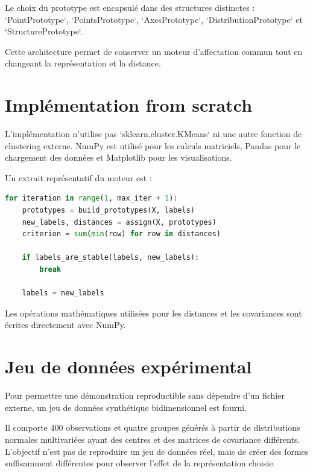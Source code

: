 \documentclass[12pt,a4paper]{article}
\begin{document}
Le choix du prototype est encapsulé dans des structures distinctes : `PointPrototype`, `PointsPrototype`, `AxesPrototype`, `DistributionPrototype` et `StructurePrototype`.

Cette architecture permet de conserver un moteur d'affectation commun tout en changeant la représentation et la distance.

\section{Implémentation from scratch}

L'implémentation n'utilise pas `sklearn.cluster.KMeans` ni une autre fonction de clustering externe. NumPy est utilisé pour les calculs matriciels, Pandas pour le chargement des données et Matplotlib pour les visualisations.

Un extrait représentatif du moteur est :

\begin{lstlisting}[language=Python,caption={Schéma de l'itération principale.}]
for iteration in range(1, max_iter + 1):
    prototypes = build_prototypes(X, labels)
    new_labels, distances = assign(X, prototypes)
    criterion = sum(min(row) for row in distances)

    if labels_are_stable(labels, new_labels):
        break

    labels = new_labels
\end{lstlisting}

Les opérations mathématiques utilisées pour les distances et les covariances sont écrites directement avec NumPy.

\section{Jeu de données expérimental}

Pour permettre une démonstration reproductible sans dépendre d'un fichier externe, un jeu de données synthétique bidimensionnel est fourni.

Il comporte 400 observations et quatre groupes générés à partir de distributions normales multivariées ayant des centres et des matrices de covariance différents. L'objectif n'est pas de reproduire un jeu de données réel, mais de créer des formes suffisamment différentes pour observer l'effet de la représentation choisie.
\end{document}
